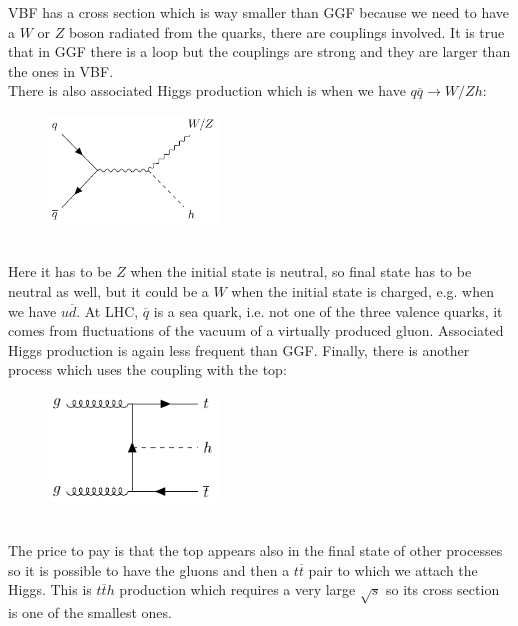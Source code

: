 \documentclass[../main.tex]{subfiles}
\begin{document}
VBF has a cross section which is way smaller than GGF because we need to have a $W$ or $Z$ boson radiated from the quarks, there are couplings involved. It is true that in GGF there is a loop but the couplings are strong and they are larger than the ones in VBF.\\
There is also associated Higgs production which is when we have $q\overline{q}\to W/Zh$:
\begin{figure}[h]
    \centering
    \includegraphics[width=0.4\textwidth]{Images/higgsprod.pdf}
    \caption*{}
\end{figure}\\
Here it has to be $Z$ when the initial state is neutral, so final state has to be neutral as well, but it could be a $W$ when the initial state is charged, e.g. when we have $u\overline{d}$. At LHC, $\overline{q}$ is a sea quark, i.e. not one of the three valence quarks, it comes from fluctuations of the vacuum of a virtually produced gluon. Associated Higgs production is again less frequent than GGF. Finally, there is another process which uses the coupling with the top:
\begin{figure}[h]
    \centering
    \includegraphics[width=0.4\textwidth]{Images/tth.pdf}
    \caption*{}
\end{figure}\\
The price to pay is that the top appears also in the final state of other processes so it is possible to have the gluons and then a $t\overline{t}$ pair to which we attach the Higgs. This is $t\overline{t}h$ production which requires a very large $\sqrt{s}$ so its cross section is one of the smallest ones.\\
\end{document}
